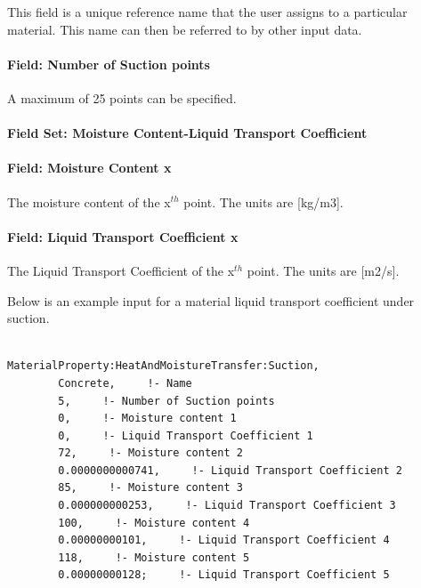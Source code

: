 This field is a unique reference name that the user assigns to a particular material. This name can then be referred to by other input data.

\paragraph{Field: Number of Suction points}\label{field-number-of-suction-points}

A maximum of 25 points can be specified.

\paragraph{Field Set: Moisture Content-Liquid Transport Coefficient}\label{field-set-moisture-content-liquid-transport-coefficient}

\paragraph{Field: Moisture Content x}\label{field-moisture-content-x-1}

The moisture content of the x\(^{th}\) point. The units are {[}kg/m3{]}.

\paragraph{Field: Liquid Transport Coefficient x}\label{field-liquid-transport-coefficient-x}

The Liquid Transport Coefficient of the x\(^{th}\) point. The units are {[}m2/s{]}.

Below is an example input for a material liquid transport coefficient under suction.

\begin{lstlisting}

MaterialProperty:HeatAndMoistureTransfer:Suction,
        Concrete,     !- Name
        5,     !- Number of Suction points
        0,     !- Moisture content 1
        0,     !- Liquid Transport Coefficient 1
        72,     !- Moisture content 2
        0.0000000000741,     !- Liquid Transport Coefficient 2
        85,     !- Moisture content 3
        0.000000000253,     !- Liquid Transport Coefficient 3
        100,     !- Moisture content 4
        0.00000000101,     !- Liquid Transport Coefficient 4
        118,     !- Moisture content 5
        0.00000000128;     !- Liquid Transport Coefficient 5
\end{lstlisting}

